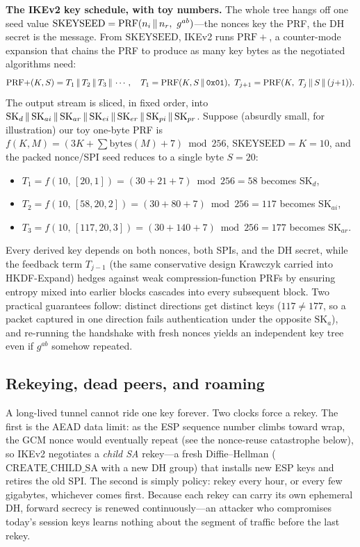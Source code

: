 \begin{implementbox}
\textbf{The IKEv2 key schedule, with toy numbers.} The whole tree hangs off one seed value \(\mathrm{SKEYSEED} = \mathrm{PRF}(n_i \concat n_r,\ g^{ab})\)---the nonces key the PRF, the DH secret is the message. From \(\mathrm{SKEYSEED}\), IKEv2 runs \(\mathrm{PRF+}\), a counter-mode expansion that chains the PRF to produce as many key bytes as the negotiated algorithms need:
\[
\mathrm{PRF{+}}(K, S) = T_1 \,\|\, T_2 \,\|\, T_3 \,\|\, \cdots,\quad
T_1 = \mathrm{PRF}(K, S \,\|\, \texttt{0x01}),\
T_{j+1} = \mathrm{PRF}(K,\ T_j \,\|\, S \,\|\, (j{+}1)).
\]
The output stream is sliced, in fixed order, into \(\mathrm{SK}_d \,\|\, \mathrm{SK}_{ai}\,\|\, \mathrm{SK}_{ar}\,\|\, \mathrm{SK}_{ei}\,\|\, \mathrm{SK}_{er}\,\|\, \mathrm{SK}_{pi}\,\|\, \mathrm{SK}_{pr}\). Suppose (absurdly small, for illustration) our toy one-byte PRF is \(f(K, M) = (3K + \sum \text{bytes}(M) + 7)\bmod 256\), \(\mathrm{SKEYSEED} = K = 10\), and the packed nonce/SPI seed reduces to a single byte \(S = 20\):
\begin{itemize}
\item \(T_1 = f(10,\, [20, 1]) = (30 + 21 + 7)\bmod 256 = 58\) becomes \(\mathrm{SK}_d\),
\item \(T_2 = f(10,\, [58, 20, 2]) = (30 + 80 + 7)\bmod 256 = 117\) becomes \(\mathrm{SK}_{ai}\),
\item \(T_3 = f(10,\, [117, 20, 3]) = (30 + 140 + 7)\bmod 256 = 177\) becomes \(\mathrm{SK}_{ar}\).
\end{itemize}
Every derived key depends on both nonces, both SPIs, and the DH secret, while the feedback term \(T_{j-1}\) (the same conservative design Krawczyk carried into HKDF-Expand) hedges against weak compression-function PRFs by ensuring entropy mixed into earlier blocks cascades into every subsequent block. Two practical guarantees follow: distinct directions get distinct keys (\(117 \neq 177\), so a packet captured in one direction fails authentication under the opposite \(\mathrm{SK}_a\)), and re-running the handshake with fresh nonces yields an independent key tree even if \(g^{ab}\) somehow repeated.
\end{implementbox}

\subsection{Rekeying, dead peers, and roaming}

A long-lived tunnel cannot ride one key forever. Two clocks force a rekey. The first is the AEAD data limit: as the ESP sequence number climbs toward wrap, the GCM nonce would eventually repeat (see the nonce-reuse catastrophe below), so IKEv2 negotiates a \emph{child SA} rekey---a fresh Diffie--Hellman (\(\mathrm{CREATE\_CHILD\_SA}\) with a new DH group) that installs new ESP keys and retires the old SPI. The second is simply policy: rekey every hour, or every few gigabytes, whichever comes first. Because each rekey can carry its own ephemeral DH, forward secrecy is renewed continuously---an attacker who compromises today's session keys learns nothing about the segment of traffic before the last rekey.

